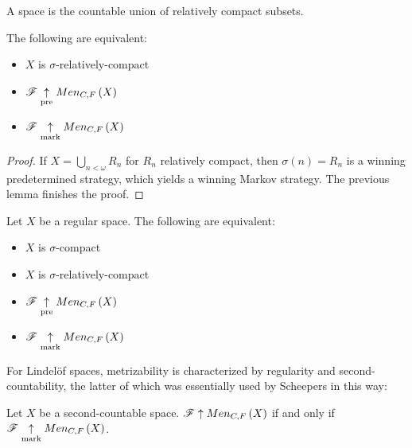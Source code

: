 \begin{defn}
  A  space is the countable union of
  relatively compact subsets.
\end{defn}

\begin{cor}
  The following are equivalent:
  \begin{itemize}
    \item $X$ is $\sigma$-relatively-compact
    \item $\mathscr{F} \underset{\text{pre}}{\uparrow} Men_{C,F}\left({X}\right)$
    \item $\mathscr{F} \underset{\text{mark}}{\uparrow} Men_{C,F}\left({X}\right)$
  \end{itemize}
\end{cor}

\begin{proof}
  If $X=\bigcup_{n<\omega} R_n$ for $R_n$ relatively compact, then
  $\sigma(n)=R_n$ is a winning predetermined strategy, which yields a
  winning Markov strategy. The previous lemma finishes the proof.
\end{proof}

\begin{cor}
  Let $X$ be a regular space. The following are equivalent:
  \begin{itemize}
    \item $X$ is $\sigma$-compact
    \item $X$ is $\sigma$-relatively-compact
    \item $\mathscr{F} \underset{\text{pre}}{\uparrow} Men_{C,F}\left({X}\right)$
    \item $\mathscr{F} \underset{\text{mark}}{\uparrow} Men_{C,F}\left({X}\right)$
  \end{itemize}
\end{cor}

For Lindel\"of spaces, metrizability is characterized by regularity and
second-countability, the latter of which was essentially used by Scheepers in
this way:

\begin{lem}
  Let $X$ be a second-countable space. $\mathscr{F}\uparrow Men_{C,F}\left({X}\right)$ if and only if
  $\mathscr{F}\underset{\text{mark}}{\uparrow}Men_{C,F}\left({X}\right)$.
\end{lem}

